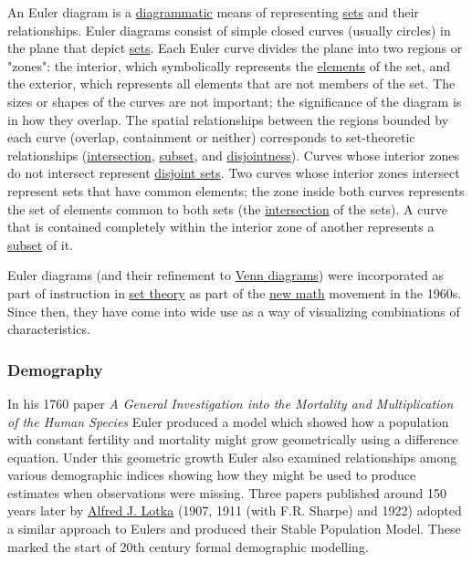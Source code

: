 An Euler diagram is a \href{https://en.wikipedia.org/wiki/Diagram}{diagrammatic} means of representing \href{https://en.wikipedia.org/wiki/Set_(mathematics)}{sets} and their relationships. Euler diagrams consist of simple closed curves (usually circles) in the plane that depict \href{https://en.wikipedia.org/wiki/Set_(mathematics)}{sets}. Each Euler curve divides the plane into two regions or "zones": the interior, which symbolically represents the \href{https://en.wikipedia.org/wiki/Element_(mathematics)}{elements} of the set, and the exterior, which represents all elements that are not members of the set. The sizes or shapes of the curves are not important; the significance of the diagram is in how they overlap. The spatial relationships between the regions bounded by each curve (overlap, containment or neither) corresponds to set-theoretic relationships (\href{https://en.wikipedia.org/wiki/Intersection_(set_theory)}{intersection}, \href{https://en.wikipedia.org/wiki/Subset}{subset}, and \href{https://en.wikipedia.org/wiki/Disjoint_sets}{disjointness}). Curves whose interior zones do not intersect represent \href{https://en.wikipedia.org/wiki/Disjoint_sets}{disjoint sets}. Two curves whose interior zones intersect represent sets that have common elements; the zone inside both curves represents the set of elements common to both sets (the \href{https://en.wikipedia.org/wiki/Intersection_(set_theory)}{intersection} of the sets). A curve that is contained completely within the interior zone of another represents a \href{https://en.wikipedia.org/wiki/Subset}{subset} of it.

Euler diagrams (and their refinement to \href{https://en.wikipedia.org/wiki/Venn_diagram}{Venn diagrams}) were incorporated as part of instruction in \href{https://en.wikipedia.org/wiki/Set_theory}{set theory} as part of the \href{https://en.wikipedia.org/wiki/New_math}{new math} movement in the 1960s. Since then, they have come into wide use as a way of visualizing combinations of characteristics.


\subsubsection{Demography}\label{Demography}

In his 1760 paper \emph{A General Investigation into the Mortality and Multiplication of the Human Species} Euler produced a model which showed how a population with constant fertility and mortality might grow geometrically using a difference equation. Under this geometric growth Euler also examined relationships among various demographic indices showing how they might be used to produce estimates when observations were missing. Three papers published around 150 years later by \href{https://en.wikipedia.org/wiki/Alfred_J._Lotka}{Alfred J. Lotka} (1907, 1911 (with F.R. Sharpe) and 1922) adopted a similar approach to Euler\textquotesingle s and produced their Stable Population Model. These marked the start of 20th century formal demographic modelling.


